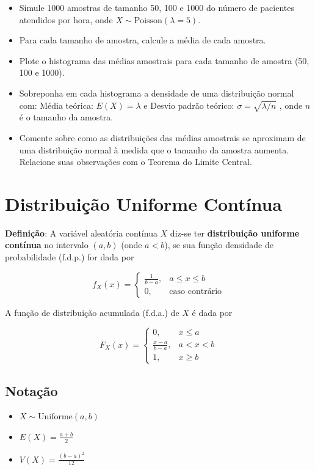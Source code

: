 \documentclass[
]{book}
\providecommand{\tightlist}{%
  \setlength{\itemsep}{0pt}\setlength{\parskip}{0pt}}
\begin{document}
\begin{itemize}
\tightlist
\item
  Simule 1000 amostras de tamanho 50, 100 e 1000 do número de pacientes atendidos por hora, onde \(X \sim \text{Poisson}(\lambda = 5)\).
\item
  Para cada tamanho de amostra, calcule a média de cada amostra.
\item
  Plote o histograma das médias amostrais para cada tamanho de amostra (50, 100 e 1000).
\item
  Sobreponha em cada histograma a densidade de uma distribuição normal com: Média teórica: \(E(X) = \lambda\) e Desvio padrão teórico: \(\sigma = \sqrt{\lambda / n}\) , onde \(n\) é o tamanho da amostra.
\item
  Comente sobre como as distribuições das médias amostrais se aproximam de uma distribuição normal à medida que o tamanho da amostra aumenta. Relacione suas observações com o Teorema do Limite Central.
\end{itemize}

\section{Distribuição Uniforme Contínua}\label{distribuiuxe7uxe3o-uniforme-contuxednua}

\textbf{Definição}: A variável aleatória contínua \(X\) diz-se ter \textbf{distribuição uniforme contínua} no intervalo \((a, b)\) (onde \(a < b\)), se sua função densidade de probabilidade (f.d.p.) for dada por

\[
f_{X}(x) = \begin{cases} 
\frac{1}{b - a}, & a \leq x \leq b \\ 
0, & \text{caso contrário} 
\end{cases}
\]

A função de distribuição acumulada (f.d.a.) de \(X\) é dada por

\[
F_{X}(x) = \begin{cases} 
0, & x \leq a \\ 
\frac{x - a}{b - a}, & a < x < b \\ 
1, & x \geq b 
\end{cases}
\]

\subsection{Notação}\label{notauxe7uxe3o}

\begin{itemize}
\tightlist
\item
  \(X \sim \text{Uniforme}(a, b)\)
\item
  \(E(X) = \frac{a + b}{2}\)
\item
  \(V(X) = \frac{(b - a)^2}{12}\)
\end{itemize}
\end{document}
